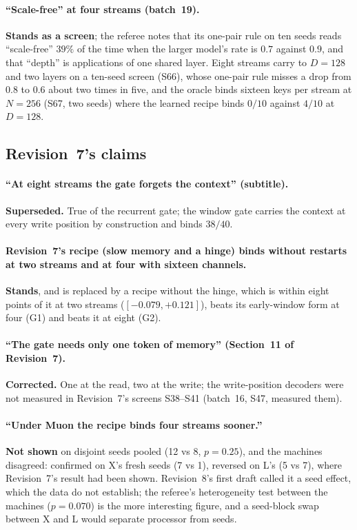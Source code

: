 \documentclass[11pt]{article}
\begin{document}
\paragraph{``Scale-free'' at four streams (batch~19).} \textbf{Stands as a screen}; the referee notes that its one-pair rule on ten seeds reads ``scale-free'' $39\%$ of the time when the larger model's rate is $0.7$ against $0.9$, and that ``depth'' is applications of one shared layer. Eight streams carry to $D = 128$ and two layers on a ten-seed screen (S66), whose one-pair rule misses a drop from $0.8$ to $0.6$ about two times in five, and the oracle binds sixteen keys per stream at $N = 256$ (S67, two seeds) where the learned recipe binds $0/10$ against $4/10$ at $D = 128$.

\subsection{Revision~7's claims}

\paragraph{``At eight streams the gate forgets the context'' (subtitle).} \textbf{Superseded.} True of the recurrent gate; the window gate carries the context at every write position by construction and binds $38/40$.

\paragraph{Revision~7's recipe (slow memory and a hinge) binds without restarts at two streams and at four with sixteen channels.} \textbf{Stands}, and is replaced by a recipe without the hinge, which is within eight points of it at two streams ($[-0.079, +0.121]$), beats its early-window form at four (G1) and beats it at eight (G2).

\paragraph{``The gate needs only one token of memory'' (Section~11 of Revision~7).} \textbf{Corrected.} One at the read, two at the write; the write-position decoders were not measured in Revision~7's screens S38--S41 (batch~16, S47, measured them).

\paragraph{``Under Muon the recipe binds four streams sooner.''} \textbf{Not shown} on disjoint seeds pooled (12 vs 8, $p = 0.25$), and the machines disagreed: confirmed on X's fresh seeds (7 vs 1), reversed on L's (5 vs 7), where Revision~7's result had been shown. Revision~8's first draft called it a seed effect, which the data do not establish; the referee's heterogeneity test between the machines ($p = 0.070$) is the more interesting figure, and a seed-block swap between X and L would separate processor from seeds.
\end{document}
